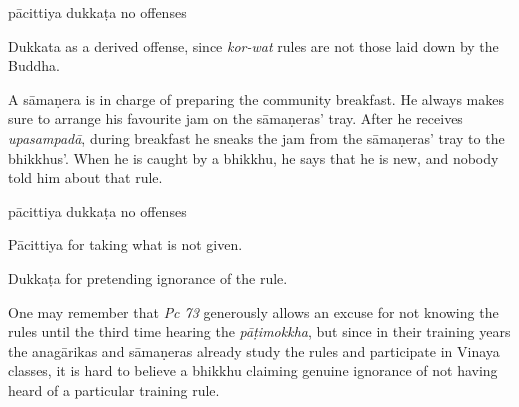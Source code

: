 \begin{exam}{\autoExamName}
\begin{problem*}
\begin{parts}
      \bigskip

      \begin{answers}{3}
        \bChoices
         pācittiya\eAns
         dukkaṭa\eAns
         no offenses\eAns
        \eChoices
      \end{answers}

      \begin{solution}
        Dukkata as a derived offense, since \emph{kor-wat} rules are not those laid down by the Buddha.
      \end{solution}

      \bigskip

      \item A sāmaṇera is in charge of preparing the community breakfast. He
      always makes sure to arrange his favourite jam on the sāmaṇeras' tray.
      After he receives \emph{upasampadā}, during breakfast he sneaks the jam
      from the sāmaṇeras' tray to the bhikkhus'. When he is caught by a bhikkhu,
      he says that he is new, and nobody told him about that rule.

      \bigskip

      \begin{answers}{3}
        \bChoices
         pācittiya\eAns
         dukkaṭa\eAns
         no offenses\eAns
        \eChoices
      \end{answers}

      \begin{solution}
        Pācittiya for taking what is not given.

        Dukkaṭa for pretending ignorance of the rule.

        One may remember that \emph{Pc 73} generously allows an excuse for not knowing the rules until the third time hearing the \emph{pāṭimokkha}, but since in their training years the anagārikas and sāmaṇeras already study the rules and participate in Vinaya classes, it is hard to believe a bhikkhu claiming genuine ignorance of not having heard of a particular training rule.
      \end{solution}

    \end{parts}

  \end{problem*}

\end{exam}
